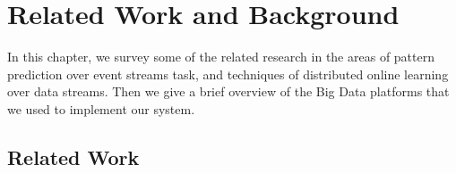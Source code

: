 
\chapter{Related Work and Background}
\label{chap:realred_work}


\par In this chapter, we survey some of the related research in the areas of pattern prediction over event streams task, and techniques of distributed online learning over data streams. Then we give a brief overview of the Big Data platforms that we used to implement our system.  
\section{Related Work}




